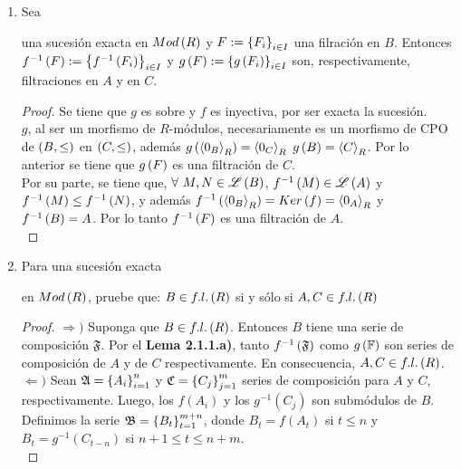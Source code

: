 \documentclass{article}
\begin{document}
\begin{enumerate}[label=\textbf{Ej \arabic*.}]
		
		\item Sea
		\begin{center}
		\end{center}
		una sucesión exacta en $Mod\left(R\right)$ y $F:={\left\{{F}_{i}\right\}}_{i\in I}$ una filración en $B$. Entonces $f^{-1}\left(F\right):=\left\{f^{-1}\left(F_i\right)\right\}_{i\in I}$ y $g\left(F\right):=\left\{g\left(F_i\right)\right\}_{i\in I}$ son, respectivamente, filtraciones en $A$ y en $C$.
		\begin{proof}
			Se tiene que $g$ es sobre y $f$ es inyectiva, por ser exacta la sucesión.\\
			$g$, al ser un morfismo de $R$-módulos, necesariamente es un morfismo de CPO de $\left(B,\leq\right)$ en $\left(C,\leq\right)$, además $g\left(\left< 0_B\right>_{R}\right)=\left< 0_C\right>_{R}$ $g\left(B\right)=\left< C\right>_{R}$. Por lo anterior se tiene que $g\left(F\right)$ es una filtración de $C$.\\
			Por su parte, se tiene  que, $\forall\ M,N\in\genlin{B}$,  $f^{-1}\left(M\right)\in\mathscr{L}\left(A\right)$ y $f^{-1}\left(M\right)\leq f^{-1}\left(N\right)$,  y además $f^{-1}\left(\left< 0_B\right>_{R}\right)=Ker\left(f\right)=\left< 0_A\right>_{R}$ y $f^{-1}\left(B\right)=A$. Por lo tanto $f^{-1}\left(F\right)$ es una filtración de $A$.\\
		\end{proof}
		\item %
		Para una sucesión exacta
		en $Mod\left(R\right)$, pruebe que: $B \in f.l.\left(R\right)$ si y sólo si $A,C \in f.l.\left(R\right)$
		\begin{proof}
			$\boxed{\Rightarrow )}$ Suponga que $B \in f.l.\left(R\right)$. Entonces $B$ tiene una serie de composición $\mathfrak{F}$. Por el \textbf{Lema 2.1.1.a)}, tanto $f^{-1}\left(\mathfrak{F}\right)$ como $g\left(\mathbb{F}\right)$ son series de composición de $A$ y de $C$ respectivamente. En consecuencia, $A,C \in f.l.\left(R\right)$.\\
			
			$\boxed{\Leftarrow )}$ Sean $\mathfrak{A}={\left\{{A}_{i}\right\}}_{i=1}^{n}$ y $\mathfrak{C}={\left\{{C}_{j}\right\}}_{j=1}^{m}$ series de composición para $A$ y $C$, respectivamente. Luego, los $f(A_{i})$ y los $g^{-1}(C_{j})$ son submódulos de $B$. Definimos la serie $\mathfrak{B}={\left\{{B}_{t}\right\}}_{t=1}^{m+n}$, donde $B_{t}=f(A_{t})$ si $t \leq n$ y $B_{t}=g^{-1}(C_{t-n})$ si $n+1 \leq t \leq n+m$.\\
			

\end{proof}
\end{enumerate}
\end{document}
